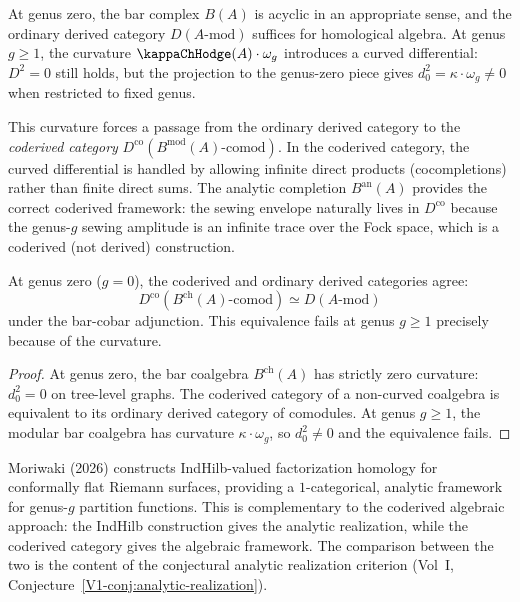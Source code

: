 \begin{remark}
At genus zero, the bar complex $B(A)$ is acyclic in an appropriate sense,
and the ordinary derived category $D(A\text{-mod})$ suffices for
homological algebra. At genus $g \ge 1$, the curvature
$\kappaChHodge(A) \cdot \omega_g$ introduces a curved differential:
$D^2 = 0$ still holds, but the projection to the genus-zero piece
gives $d_0^2 = \kappa \cdot \omega_g \neq 0$ when restricted to
fixed genus.

This curvature forces a passage from the ordinary derived category to the
\emph{coderived category} $D^{\mathrm{co}}(B^{\mathrm{mod}}(A)\text{-comod})$.
In the coderived category, the curved differential is handled by allowing
infinite direct products (cocompletions) rather than finite direct sums.
The analytic completion $B^{\mathrm{an}}(A)$ provides the correct coderived
framework: the sewing envelope naturally lives in $D^{\mathrm{co}}$
because the genus-$g$ sewing amplitude is an infinite trace over the
Fock space, which is a coderived (not derived) construction.
\end{remark}

\begin{proposition}
At genus zero ($g = 0$), the coderived and ordinary derived categories
agree:
\[
D^{\mathrm{co}}(B^{\mathrm{ch}}(A)\text{-comod})
\simeq
D(A\text{-mod})
\]
under the bar-cobar adjunction. This equivalence fails at genus $g \ge 1$
precisely because of the curvature.
\end{proposition}

\begin{proof}
At genus zero, the bar coalgebra $B^{\mathrm{ch}}(A)$ has strictly
zero curvature: $d_0^2 = 0$ on tree-level graphs. The coderived
category of a non-curved coalgebra is equivalent to its ordinary
derived category of comodules. At genus $g \ge 1$, the modular bar
coalgebra has curvature $\kappa \cdot \omega_g$, so $d_0^2 \neq 0$
and the equivalence fails.
\end{proof}

\begin{remark}
Moriwaki (2026) constructs IndHilb-valued factorization homology for
conformally flat Riemann surfaces, providing a $1$-categorical, analytic
framework for genus-$g$ partition functions. This is complementary to
the coderived algebraic approach: the IndHilb construction gives the
analytic realization, while the coderived category gives the algebraic
framework. The comparison between the two is the content of the
conjectural analytic realization criterion
(Vol~I, Conjecture~\ref*{V1-conj:analytic-realization}).
\end{remark}

